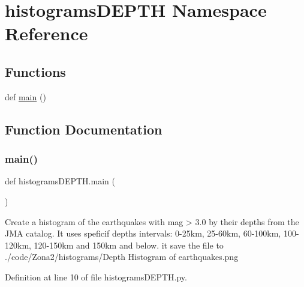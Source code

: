 \hypertarget{namespacehistograms_d_e_p_t_h}{}\section{histograms\+D\+E\+P\+TH Namespace Reference}
\label{namespacehistograms_d_e_p_t_h}
\subsection*{Functions}
\begin{DoxyCompactItemize}
\item 
def \hyperlink{namespacehistograms_d_e_p_t_h_a0950673052211532d292ea5b42b4132e}{main} ()
\end{DoxyCompactItemize}


\subsection{Function Documentation}
\mbox{\label{namespacehistograms_d_e_p_t_h_a0950673052211532d292ea5b42b4132e}} 
\subsubsection{\texorpdfstring{main()}{main()}}
{\footnotesize\ttfamily def histograms\+D\+E\+P\+T\+H.\+main (\begin{DoxyParamCaption}{ }\end{DoxyParamCaption})}

\begin{DoxyVerb}Create a histogram of the earthquakes with mag > 3.0 by their depths from the JMA catalog.
It uses speficif depths intervals: 0-25km, 25-60km, 60-100km, 100-120km, 120-150km and 150km and below.
it save the file to ./code/Zona2/histograms/Depth Histogram of earthquakes.png
\end{DoxyVerb}
 

Definition at line 10 of file histograms\+D\+E\+P\+T\+H.\+py.

